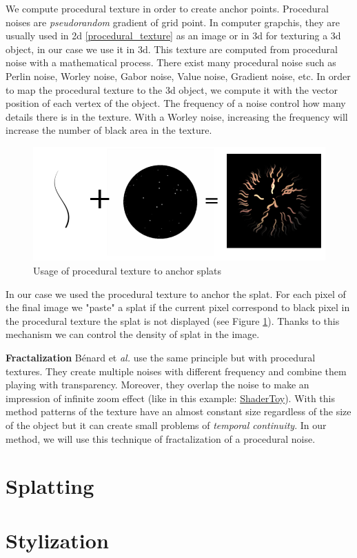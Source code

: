 
We compute procedural texture in order to create anchor points. Procedural noises are \textit{pseudorandom} gradient of grid point. In computer grapchis, they are usually used in 2d \ref{procedural_texture} as an image or in 3d for texturing a 3d object, in our case we use it in 3d. This texture are computed from procedural noise with a mathematical process. There exist many procedural noise such as Perlin noise, Worley noise, Gabor noise, Value noise, Gradient noise, etc. In order to map the procedural texture to the 3d object, we compute it with the vector position of each vertex of the object. The frequency of a noise control how many details there is in the texture. With a Worley noise, increasing the frequency will increase the number of black area in the texture.


\begin{figure}
    \begin{center}
    \includegraphics[scale=0.6]{images/noise/addition.png}
    \end{center}
    \caption{Usage of procedural texture to anchor splats}
    \label{procedural_noise_anchor}
\end{figure}

In our case we used the procedural texture to anchor the splat. For each pixel of the final image we "paste" a splat if the current pixel correspond to black pixel in the procedural texture the splat is not displayed (see Figure \ref{procedural_noise_anchor}). Thanks to this mechanism we can control the density of splat in the image.



\textbf{Fractalization}
 Bénard et \textit{al.}\cite{benard_dynamic_2010} use the same principle but with procedural textures. They create multiple noises with different frequency and combine them playing with transparency. Moreover, they overlap the noise to make an impression of infinite zoom effect (like in this example: \href{https://www.shadertoy.com/view/XlBXWw?fbclid=IwAR1fU2JxQzXtks1ZcmVmzrHiv646G8w2gWceeiV-UToeFkAFMQ2NecbsGGs}{ShaderToy}). With this method patterns of the texture have an almost constant size regardless of the size of the object but it can create small problems of \textit{temporal continuity}. In our method, we will use this technique of fractalization of a procedural noise. \newline

\section{Splatting}


\section{Stylization}
